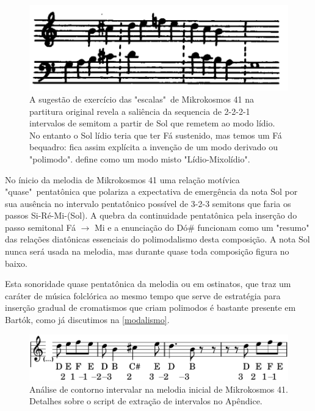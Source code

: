 \documentclass[
	12pt,				%
	openright,			%
	twoside,			%
	a4paper,			%
	english,			%
	french,				%
	spanish,			%
	brazil				%
	]{abntex2}
\begin{document}
\begin{figure}[!h]
	\caption{\label{fig_grafico}A sugestão de exercício das "escalas"\ de Mikrokosmos 41 na partitura original revela a saliência da sequencia de 2-2-2-1 intervalos de semitom a partir de Sol que remetem ao modo lídio. No entanto o Sol lídio teria que ter Fá sustenido, mas temos um Fá bequadro: fica assim explícita a invenção de um modo derivado ou "polimodo".  define como um modo misto "Lídio-Mixolídio". } 
	\begin{center}
	    \includegraphics[scale=0.3]{estudosM21/mikro041_exercicio.png}
	\end{center}
\end{figure}


No ínicio da melodia de Mikrokosmos 41 uma relação motívica "quase"\ pentatônica que polariza a expectativa de emergência da nota Sol por sua ausência no intervalo pentatônico possível de 3-2-3 semitons que faria os passos Si-Ré-Mi-(Sol). A quebra da continuidade pentatônica pela inserção do passo semitonal Fá $ \rightarrow $ Mi e a enunciação do Dó\# funcionam como um "resumo" das relações diatônicas essenciais do polimodalismo desta composição. A nota Sol nunca será usada na melodia, mas durante quase toda composição figura no baixo.

Esta sonoridade quase pentatônica da melodia ou em ostinatos, que traz um caráter de música folclórica ao mesmo tempo que serve de estratégia para inserção gradual de cromatismos que criam polimodos é bastante presente em Bartók, como já discutimos na \autoref{modalismo}.

\begin{figure}[!h]
	\caption{\label{fig_grafico} Análise de contorno intervalar na melodia inicial de Mikrokosmos 41. Detalhes sobre o script de extração de intervalos no Apêndice.  } 
	\begin{center}
	    \includegraphics[scale=0.3]{estudosM21/mikro041_contorno01.png}
	\end{center}
\end{figure}
\end{document}
